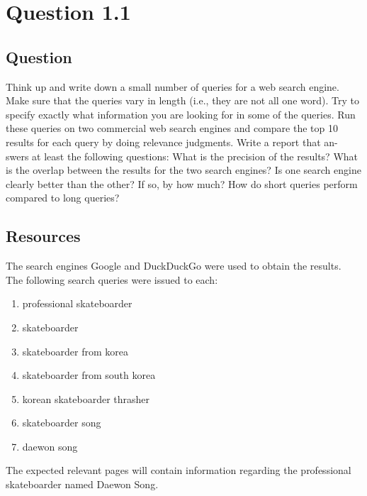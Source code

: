 \section{Question 1.1}

\subsection{Question}

Think up and write down a small number of queries for a web search engine.
Make sure that the queries vary in length (i.e., they are not all one word). Try
to specify exactly what information you are looking for in some of the queries.
Run these queries on two commercial web search engines and compare the top
10 results for each query by doing relevance judgments. Write a report that an-
swers at least the following questions: What is the precision of the results? What
is the overlap between the results for the two search engines? Is one search engine
clearly better than the other? If so, by how much? How do short queries perform
compared to long queries?

\subsection{Resources}
The search engines Google \cite{google} and DuckDuckGo \cite{duckduckgo} were used to obtain the results.\\

The following search queries were issued to each:

\begin{enumerate}
	\item professional skateboarder
	\item skateboarder
	\item skateboarder from korea
	\item skateboarder from south korea
	\item korean skateboarder thrasher
	\item skateboarder song
	\item daewon song
\end{enumerate}

The expected relevant pages will contain information regarding the professional skateboarder named Daewon Song.